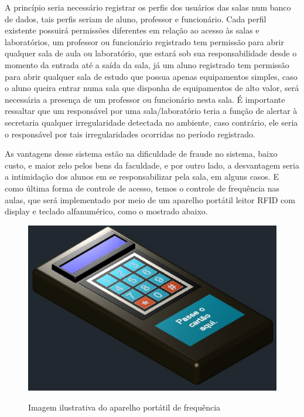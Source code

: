 A princípio seria necessário registrar os perfis dos usuários das salas num banco de dados, tais perfis seriam de aluno, professor e funcionário. Cada perfil existente possuirá permissões diferentes em relação ao acesso às salas e laboratórios, um professor ou funcionário registrado tem permissão para abrir qualquer sala de aula ou laboratório, que estará sob sua responsabilidade desde o momento da entrada até a saída da sala, já um aluno registrado tem permissão para abrir qualquer sala de estudo que possua apenas equipamentos simples, caso o aluno queira entrar numa sala que disponha de equipamentos de alto valor, será necessária a presença de um professor ou funcionário nesta sala. É importante ressaltar que um responsável por uma sala/laboratório teria a função de alertar à secretaria qualquer irregularidade detectada no ambiente, caso contrário, ele seria o responsável por tais irregularidades ocorridas no período registrado.

As vantagens desse sistema estão na dificuldade de fraude no sistema, baixo custo, e maior zelo pelos bens da faculdade, e por outro lado, a desvantagem seria a intimidação dos alunos em se responsabilizar pela sala, em alguns casos.
E como última forma de controle de acesso, temos o controle de frequência nas aulas, que será implementado por meio de um aparelho portátil leitor RFID com display e teclado alfanumérico, como o mostrado abaixo.

\begin{figure}[!h]
 \centering	\includegraphics[keepaspectratio=true,scale=0.5]{figuras/freq.eps}
 \label{fig022433}
 \caption{Imagem ilustrativa do aparelho portátil de frequência}
\end{figure}
\pagebreak


